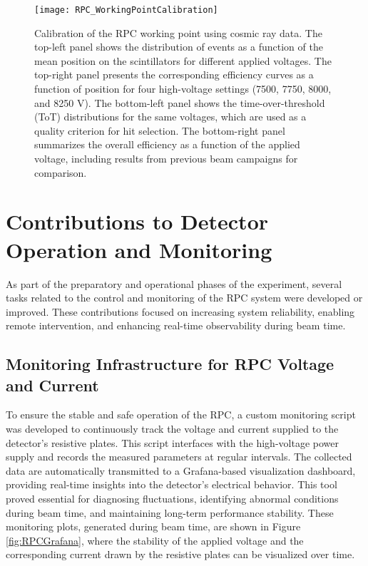 {{{\begin{figure}[H]
	\centering
	\texttt{[image: RPC\_WorkingPointCalibration]}
	\caption{Calibration of the RPC working point using cosmic ray data. The top-left panel shows the distribution of events as a function of the mean position on the scintillators for different applied voltages. The top-right panel presents the corresponding efficiency curves as a function of position for four high-voltage settings (7500, 7750, 8000, and 8250 V). The bottom-left panel shows the time-over-threshold (ToT) distributions for the same voltages, which are used as a quality criterion for hit selection. The bottom-right panel summarizes the overall efficiency as a function of the applied voltage, including results from previous beam campaigns for comparison.}
	\label{fig:RPC_WorkingPointCalibration}
\end{figure}

\section{Contributions to Detector Operation and Monitoring}

As part of the preparatory and operational phases of the experiment, several tasks related to the control and monitoring of the \gls{RPC} system were developed or improved. These contributions focused on increasing system reliability, enabling remote intervention, and enhancing real-time observability during beam time.

\subsection{Monitoring Infrastructure for RPC Voltage and Current}

To ensure the stable and safe operation of the \gls{RPC}, a custom monitoring script was developed to continuously track the voltage and current supplied to the detector’s resistive plates. This script interfaces with the high-voltage power supply and records the measured parameters at regular intervals. The collected data are automatically transmitted to a Grafana-based visualization dashboard, providing real-time insights into the detector’s electrical behavior. This tool proved essential for diagnosing fluctuations, identifying abnormal conditions during beam time, and maintaining long-term performance stability.
These monitoring plots, generated during beam time, are shown in Figure \ref{fig:RPCGrafana}, where the stability of the applied voltage and the corresponding current drawn by the resistive plates can be visualized over time.

}}}
